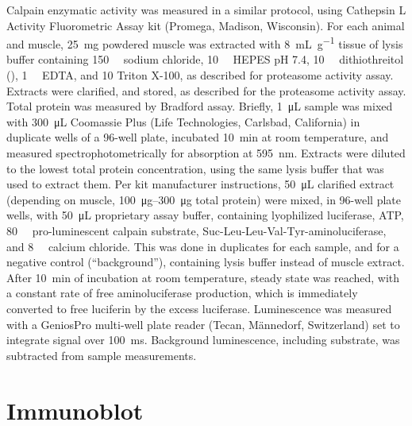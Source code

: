 \documentclass[12pt,english]{report}\usepackage[]{graphicx}\usepackage[]{color}
\begin{document}
Calpain enzymatic activity was measured in a similar protocol, using
Cathepsin L Activity Fluorometric Assay kit (Promega, Madison, Wisconsin).
For each animal and muscle, \SI{25}{\milli\gram} powdered muscle
was extracted with \SI{8}{\milli\liter\per\gram} tissue of lysis
buffer containing \SI{150}{\milli\molar} sodium chloride, \SI{10}{\milli\molar}
HEPES pH 7.4, \SI{10}{\milli\molar} dithiothreitol (),
\SI{1}{\milli\molar} EDTA, and \SI{10}{\promille} Triton X-100,
as described for proteasome activity assay. Extracts were clarified,
and stored, as described for the proteasome activity assay. Total
protein was measured by Bradford assay. Briefly, \SI{1}{\micro\liter}
sample was mixed with \SI{300}{\micro\liter} Coomassie Plus (Life
Technologies, Carlsbad, California) in duplicate wells of a 96-well
plate, incubated \SI{10}{\minute} at room temperature, and measured
spectrophotometrically for absorption at \SI{595}{\nano\meter}. Extracts
were diluted to the lowest total protein concentration, using the
same lysis buffer that was used to extract them. Per kit manufacturer
instructions, \SI{50}{\micro\liter} clarified extract (depending
on muscle, \SIrange{100}{300}{\micro\gram} total protein) were mixed,
in 96-well plate wells, with \SI{50}{\micro\liter} proprietary assay
buffer, containing lyophilized luciferase, ATP, \SI{80}{\micro\molar}
pro-luminescent calpain substrate, Suc-Leu-Leu-Val-Tyr-aminoluciferase,
and \SI{8}{\micro\molar} calcium chloride. This was done in duplicates
for each sample, and for a negative control (``background''), containing
lysis buffer instead of muscle extract. After \SI{10}{\minute} of
incubation at room temperature, steady state was reached, with a constant
rate of free aminoluciferase production, which is immediately converted
to free luciferin by the excess luciferase. Luminescence was measured
with a GeniosPro multi-well plate reader (Tecan, Männedorf, Switzerland)
set to integrate signal over \SI{100}{\milli\second}. Background
luminescence, including substrate, was subtracted from sample measurements.


\section{Immunoblot}
\end{document}

